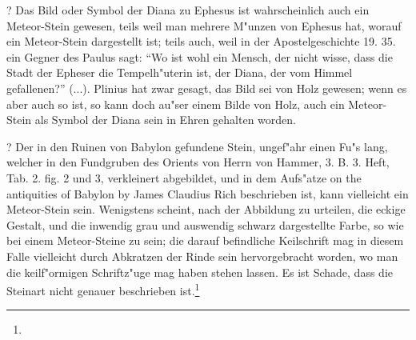 \documentclass[a4paper, 11pt, oneside, polutonikogreek, german]{article}
\begin{document}
? Das Bild oder Symbol der Diana zu Ephesus ist wahrscheinlich auch ein Meteor-Stein gewesen, teils weil man mehrere M"unzen von Ephesus hat, worauf ein Meteor-Stein dargestellt ist; teils auch, weil in der Apostelgeschichte 19. 35. ein Gegner des Paulus sagt: "`Wo ist wohl ein Mensch, der nicht wisse, dass die Stadt der Epheser die Tempelh"uterin ist, der Diana, der vom Himmel gefallenen?"' (...). Plinius hat zwar gesagt, das Bild sei von Holz gewesen; wenn es aber auch so ist, so kann doch au"ser einem Bilde von Holz, auch ein Meteor-Stein als Symbol der Diana sein in Ehren gehalten worden.

? Der in den Ruinen von Babylon gefundene Stein, ungef"ahr einen Fu"s lang, welcher in den Fundgruben des Orients von Herrn von Hammer, 3. B. 3. Heft, Tab. 2. fig. 2 und 3, verkleinert abgebildet, und in dem Aufs"atze on the antiquities of Babylon by James Claudius Rich beschrieben ist, kann vielleicht ein Meteor-Stein sein. Wenigstens scheint, nach der Abbildung zu urteilen, die eckige Gestalt, und die inwendig grau und auswendig schwarz dargestellte Farbe, so wie bei einem Meteor-Steine zu sein; die darauf befindliche Keilschrift mag in diesem Falle vielleicht durch Abkratzen der Rinde sein hervorgebracht worden, wo man die keilf"ormigen Schriftz"uge mag haben stehen lassen. Es ist Schade, dass die Steinart nicht genauer beschrieben ist.\footnote{}
\end{document}
